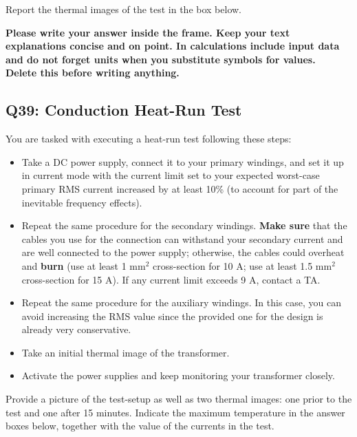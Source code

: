 \documentclass{PELsmallreport}
\begin{document}
Report the thermal images of the test in the box below. 

\begin{framed}
	\vspace{2em}
	\textbf{Please write your answer inside the frame. Keep your text explanations concise and on point. In calculations include input data and do not forget units when you substitute symbols for values. \\ Delete this before writing anything.}
	\vspace{2em}
\end{framed}

\hfill {}









\subsection{Q39: Conduction Heat-Run Test} 
You are tasked with executing a heat-run test following these steps:
\begin{itemize}
    \item Take a DC power supply, connect it to your primary windings, and set it up in current mode with the current limit set to your expected worst-case primary RMS current increased by at least 10\% (to account for part of the inevitable frequency effects). 
    \item Repeat the same procedure for the secondary windings. \textbf{Make sure} that the cables you use for the connection can withstand your secondary current and are well connected to the power supply; otherwise, the cables could overheat and \textbf{burn} (use at least 1 $\mathrm{mm}^2$ cross-section for 10 A; use at least 1.5 $\mathrm{mm}^2$ cross-section for 15 A). If any current limit exceeds 9 A, contact a TA. 
    \item Repeat the same procedure for the auxiliary windings. In this case, you can avoid increasing the RMS value since the provided one for the design is already very conservative. 
    \item Take an initial thermal image of the transformer.
    \item Activate the power supplies and keep monitoring your transformer closely. 
\end{itemize}
Provide a picture of the test-setup as well as two thermal images: one prior to the test and one after 15 minutes. 
Indicate the maximum temperature in the answer boxes below, together with the value of the currents in the test. 
\end{document}
